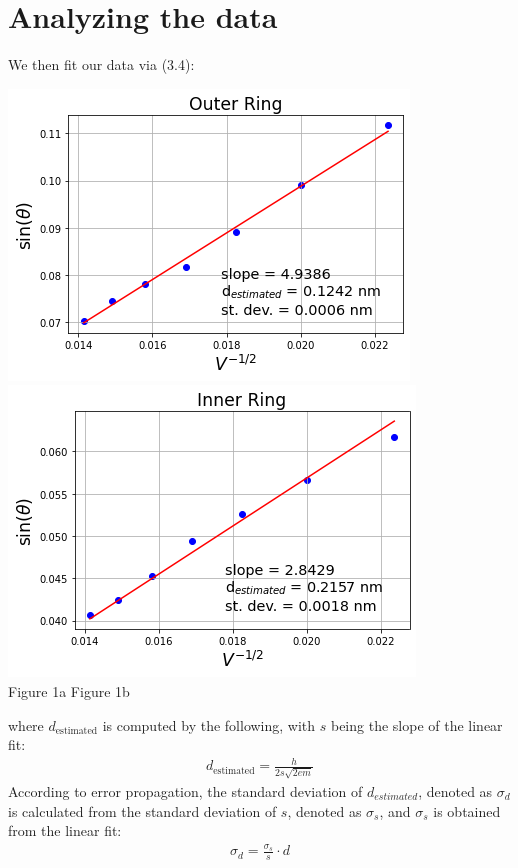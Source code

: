 \documentclass[11pt]{book}
\theoremstyle{break}
\theoremstyle{break}
\begin{document}
\section{Analyzing the data}
We then fit our data via (3.4):
\begin{center}
\includegraphics[scale=0.55]{Of.png} 
\includegraphics[scale=0.55]{If.png}\\
${}$\qquad\quad Figure 1a \qquad\qquad\qquad\qquad\qquad\qquad\qquad\qquad Figure 1b
\end{center}
where $d_{\text{estimated}}$ is computed by the following, with $s$ being the slope of the linear fit:
\begin{align*}
d_{\text{estimated}} = \frac{h}{2s\sqrt{2em}}
\end{align*}
According to error propagation, the standard deviation of $d_{estimated}$, denoted as $\sigma_d$ is calculated from the standard deviation of $s$, denoted as $\sigma_s$, and $\sigma_s$ is obtained from the linear fit:
\begin{align*}
\sigma_d = \frac{\sigma_s}{s}\cdot d
\end{align*}
\end{document}
